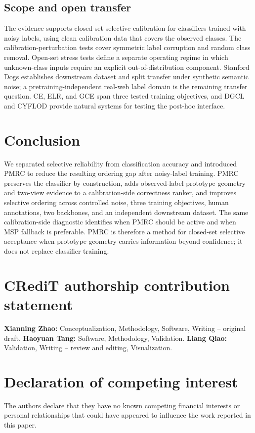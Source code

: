 \documentclass[review,times]{elsarticle}
\newcommand{\method}{PMRC}
\begin{document}
\subsection{Scope and open transfer}

The evidence supports closed-set selective calibration for classifiers trained with noisy labels, using clean calibration data that covers the observed classes. The calibration-perturbation tests cover symmetric label corruption and random class removal. Open-set stress tests define a separate operating regime in which unknown-class inputs require an explicit out-of-distribution component. Stanford Dogs establishes downstream dataset and split transfer under synthetic semantic noise; a pretraining-independent real-web label domain is the remaining transfer question. CE, ELR, and GCE span three tested training objectives, and DGCL and CYFLOD provide natural systems for testing the post-hoc interface.

\section{Conclusion}

We separated selective reliability from classification accuracy and introduced \method{} to reduce the resulting ordering gap after noisy-label training. PMRC preserves the classifier by construction, adds observed-label prototype geometry and two-view evidence to a calibration-side correctness ranker, and improves selective ordering across controlled noise, three training objectives, human annotations, two backbones, and an independent downstream dataset. The same calibration-side diagnostic identifies when PMRC should be active and when MSP fallback is preferable. PMRC is therefore a method for closed-set selective acceptance when prototype geometry carries information beyond confidence; it does not replace classifier training.

\section*{CRediT authorship contribution statement}
\textbf{Xianning Zhao:} Conceptualization, Methodology, Software, Writing --
original draft.
\textbf{Haoyuan Tang:} Software, Methodology, Validation.
\textbf{Liang Qiao:} Validation, Writing -- review and editing, Visualization.

\section*{Declaration of competing interest}
The authors declare that they have no known competing financial interests or
personal relationships that could have appeared to influence the work reported
in this paper.
\end{document}
